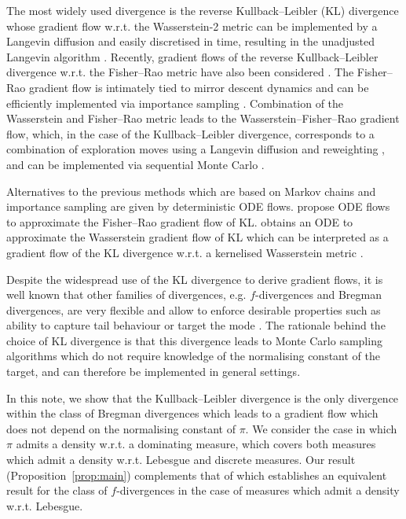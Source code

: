 \documentclass{article}
\begin{document}
The most widely used divergence is the reverse Kullback--Leibler (KL) divergence whose gradient flow w.r.t. the Wasserstein-2 metric can be implemented by a Langevin diffusion \citep{jordan1998variational} and easily discretised in time, resulting  in the unadjusted Langevin algorithm \citep{roberts1996exponential}. Recently, gradient flows of the reverse Kullback--Leibler divergence w.r.t. the Fisher--Rao metric have also been considered \citep{Lu2019, crucinio2025, chen2023sampling, domingo-enrich2023an}. The Fisher--Rao gradient flow is intimately tied to mirror descent dynamics \citep{chopin2023connection} and can be efficiently implemented via importance sampling \citep{crucinio2025, korba2022adaptive, dai2016provable}.
Combination of the Wasserstein and Fisher--Rao metric leads to the Wasserstein--Fisher--Rao gradient flow, which, in the case of the Kullback--Leibler divergence, corresponds to a combination of exploration moves using a Langevin diffusion and reweighting \citep{chewi2025statistical, lambert2022variational, yan2024learning}, and can be implemented via sequential Monte Carlo \citep{crucinio2025}.


Alternatives to the previous methods which are based on Markov chains and importance sampling are given by deterministic ODE flows. 
\cite{Nusken2024, maurais2024sampling} propose ODE flows to approximate the Fisher--Rao gradient flow of KL.  \cite{liu2017stein} obtains an ODE to approximate the Wasserstein gradient flow of KL which can be interpreted as a gradient flow of the KL divergence w.r.t. a kernelised Wasserstein metric \citep{duncan2023geometry, chewi2020svgd}.


Despite the widespread use of the KL divergence to derive gradient flows, it is well known that other families of divergences, e.g. $f$-divergences and Bregman divergences, are very flexible and allow to enforce desirable properties such as ability to capture tail behaviour or target the mode \citep{regli2018alpha}.
The rationale behind the choice of KL divergence is that this divergence leads to Monte Carlo sampling algorithms which do not require knowledge of the normalising constant of the target, and can therefore be implemented in general settings.

In this note, we show that the Kullback--Leibler divergence is the only divergence within the class of Bregman divergences which leads to a gradient flow which does not depend on the normalising constant of $\pi$. We consider the case in which $\pi$ admits a density w.r.t. a dominating measure, which covers both measures which admit a density w.r.t. Lebesgue and discrete measures.
Our result (Proposition~\ref{prop:main}) complements that of \citet[Theorem 4.1]{chen2023sampling} which establishes an equivalent result for the class of $f$-divergences in the case of measures which admit a density w.r.t. Lebesgue.
\end{document}

